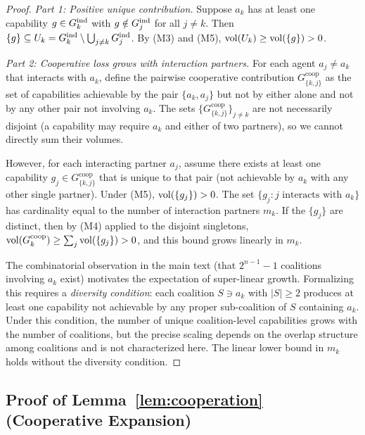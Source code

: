 \begin{proof}
\emph{Part 1: Positive unique contribution.} Suppose $a_k$ has at least one
capability $g \in G_{k}^{\mathrm{ind}}$ with $g \notin G_{j}^{\mathrm{ind}}$ for all $j \neq k$.
Then $\{g\} \subseteq U_k = G_{k}^{\mathrm{ind}} \setminus \bigcup_{j \neq k} G_{j}^{\mathrm{ind}}$.
By (M3) and (M5), $\operatorname{vol}(U_k) \geq \operatorname{vol}(\{g\}) > 0$.

\emph{Part 2: Cooperative loss grows with interaction partners.} For each
agent $a_j \neq a_k$ that interacts with $a_k$, define the pairwise
cooperative contribution $G^{\mathrm{coop}}_{\{k,j\}}$ as the set of
capabilities achievable by the pair $\{a_k, a_j\}$ but not by either alone
and not by any other pair not involving $a_k$. The sets
$\{G^{\mathrm{coop}}_{\{k,j\}}\}_{j \neq k}$ are not necessarily disjoint
(a capability may require $a_k$ and either of two partners), so we cannot
directly sum their volumes.

However, for each interacting partner $a_j$, assume there exists at least one
capability $g_j \in G^{\mathrm{coop}}_{\{k,j\}}$ that is unique to that pair
(not achievable by $a_k$ with any other single partner). Under (M5),
$\operatorname{vol}(\{g_j\}) > 0$. The set $\{g_j : j \text{ interacts with } a_k\}$
has cardinality equal to the number of interaction partners $m_k$. If the
$\{g_j\}$ are distinct, then by (M4) applied to the disjoint singletons,
$\operatorname{vol}(G^{\mathrm{coop}}_{k}) \geq \sum_{j} \operatorname{vol}(\{g_j\}) > 0$, and this
bound grows linearly in $m_k$.

The combinatorial observation in the main text (that $2^{n-1} - 1$ coalitions
involving $a_k$ exist) motivates the expectation of super-linear growth.
Formalizing this requires a \emph{diversity condition}: each coalition
$S \ni a_k$ with $|S| \geq 2$ produces at least one capability not achievable
by any proper sub-coalition of $S$ containing $a_k$. Under this condition,
the number of unique coalition-level capabilities grows with the number of
coalitions, but the precise scaling depends on the overlap structure among
coalitions and is not characterized here. The linear lower bound in $m_k$
holds without the diversity condition.
\end{proof}


\subsection{Proof of Lemma~\ref{lem:cooperation} (Cooperative Expansion)}
\label{app:proof_cooperation}

